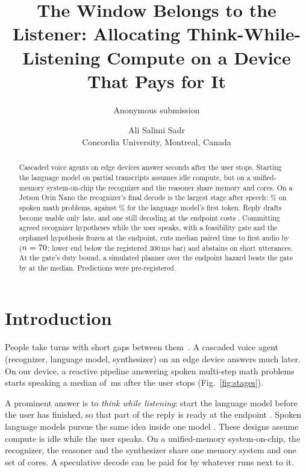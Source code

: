 \documentclass[a4paper,10pt,twocolumn]{article}
\title{The Window Belongs to the Listener: Allocating Think-While-Listening
Compute on a Device That Pays for It}
\author{Anonymous submission}
\author{Ali Salimi Sadr\\Concordia University, Montreal, Canada}
\date{}
\begin{document}
\maketitle

\begin{abstract}
Cascaded voice agents on edge devices answer seconds after the user stops.
Starting the language model on partial transcripts assumes idle compute, but
on a unified-memory system-on-chip the recognizer and the reasoner share memory
and cores. On a Jetson Orin Nano the recognizer's final decode is the largest
stage after speech: \SttShareMulti\% on spoken math problems, against
\LlmShareMulti\% for the language model's first token. Reply drafts
become usable only late, and one still decoding at the endpoint costs
\ThinkerOverlap. Committing agreed recognizer hypotheses while the user
speaks, with a feasibility gate and the orphaned hypothesis frozen at the
endpoint, cuts median paired time to first audio by \PthreeRed{}
($n=70$; lower end below the registered 300\,ms bar) and abstains on
short utterances. At the gate's duty bound, a simulated planner over the
endpoint hazard beats the gate by \PlannerDP{} at the median. Predictions were
pre-registered.
\end{abstract}

\section{Introduction}
\label{sec:intro}

People take turns with short gaps between them~\cite{stivers2009universals}.
A cascaded voice agent (recognizer, language model, synthesizer) on an edge
device answers much later. On our device, a reactive pipeline answering spoken
multi-step math problems starts speaking a median of \TTFAMulti\,ms after the
user stops (Fig.~\ref{fig:stages}).

A prominent answer is to \emph{think while listening}: start the language
model before the user has finished, so that part of the reply is ready at the
endpoint \cite{predgen2025,ltsvoiceagent2026,epa2026,livemind2024}. Spoken
language models pursue the same idea inside one model
\cite{shanks2025,shih2025thinklisten}. These designs assume compute is idle
while the user speaks. On a unified-memory system-on-chip, the recognizer, the
reasoner and the synthesizer share one memory system and one set of cores. A
speculative decode can be paid for by whatever runs next to it.
\end{document}
